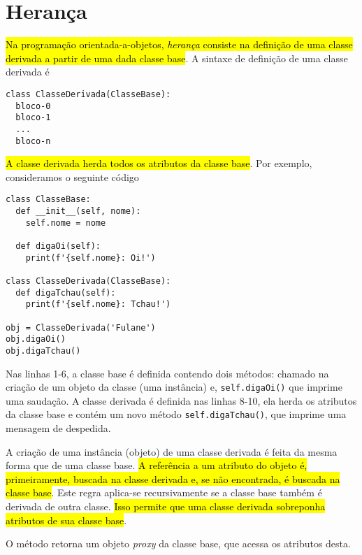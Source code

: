   

\section{Herança}\label{cap_oo_sec_her}

\hl{Na programação orientada-a-objetos, \emph{herança} consiste na definição de uma classe derivada a partir de uma dada classe base}. A sintaxe de definição de uma classe derivada é

\begin{lstlisting}
class ClasseDerivada(ClasseBase):
  bloco-0
  bloco-1
  ...
  bloco-n
\end{lstlisting}

\hl{A classe derivada herda todos os atributos da classe base}. Por exemplo, consideramos o seguinte código

\ifisbook
\newpage
\fi
\begin{lstlisting}
class ClasseBase:
  def __init__(self, nome):
    self.nome = nome
      
  def digaOi(self):
    print(f'{self.nome}: Oi!')

class ClasseDerivada(ClasseBase):
  def digaTchau(self):
    print(f'{self.nome}: Tchau!')

obj = ClasseDerivada('Fulane')
obj.digaOi()
obj.digaTchau()
\end{lstlisting}

Nas linhas 1-6, a classe base é definida contendo dois métodos: {\PYTHONobjectDOTinit} chamado na criação de um objeto da classe (uma instância) e, \lstinline+self.digaOi()+ que imprime uma saudação. A classe derivada é definida nas linhas 8-10, ela herda os atributos da classe base e contém um novo método \lstinline+self.digaTchau()+, que imprime uma mensagem de despedida.

A criação de uma instância (objeto) de uma classe derivada é feita da mesma forma que de uma classe base. \hl{A referência a um atributo do objeto é, primeiramente, buscada na classe derivada e, se não encontrada, é buscada na classe base}. Este regra aplica-se recursivamente se a classe base também é derivada de outra classe. \hl{Isso permite que uma classe derivada sobreponha atributos de sua classe base}.

\begin{obs}
O método {\PYTHONsuper} retorna um objeto \textit{proxy} da classe base, que acessa os atributos desta.
\end{obs}

